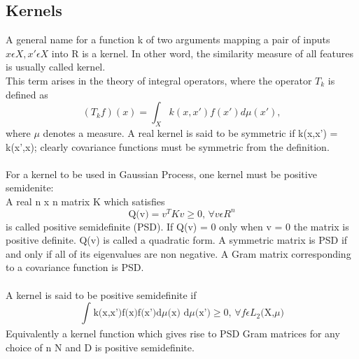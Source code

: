 \documentclass{article}
\begin{document}
	\subsection{Kernels}
	A general name for a function k of two arguments mapping a pair of inputs \( x \epsilon X, x' \epsilon X\) into R is a kernel.
	In other word, the similarity measure of all features is usually called kernel.\\
	This term arises in the theory of integral operators, where the operator \(T_{k}\) is defined as
	\begin{equation}\label{eq:Kernel_Tk}
		(T_{k}f)(x) = \int_{X} k(x,x') f(x') d\mu(x'),
	\end{equation}
	where \(\mu\) denotes a measure. A real kernel is said to be symmetric if k(x,x') = k(x',x); 
	clearly covariance functions must be symmetric from the definition.\\\\
	
	For a kernel to be used in Gaussian Process, one kernel must be  positive semidenite:\\
	A real n x n matrix K which satisfies 
	\begin{equation}\label{eq:psd_mat}
		\text{Q(v)} = v^{T}Kv \geq 0 \text{, } \forall v  \epsilon R^{n}
	\end{equation}
	is called positive semidefinite (PSD). 
	If Q(v) = 0 only when v = 0 the matrix is positive definite. Q(v) is called a quadratic form. 
	A symmetric matrix is PSD if and only if all of its eigenvalues are non negative. A Gram matrix corresponding to a covariance function is PSD.\\\\

	A kernel is said to be positive semidefinite if 
	\begin{equation}\label{eq:psd_kernel}
		\int_{}^{} \text{k(x,x')f(x)f(x')d}\mu\text{(x) d}\mu\text{(x')} \geq 0 \text{, } \forall f  \epsilon L_{2}\text{(X,}\mu\text{)}
	\end{equation}
	Equivalently a kernel function which gives rise to PSD Gram matrices for any choice of n  N and D is positive semidefinite.\\\\
\end{document}
